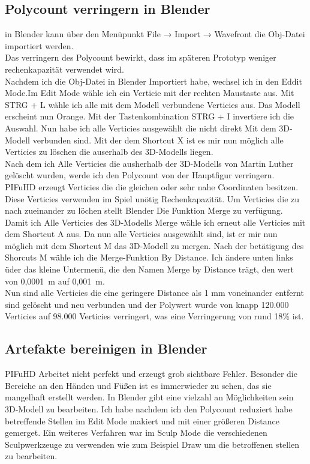 \subsection{Polycount verringern in Blender}
in Blender kann über den Menüpunkt File → Import → Wavefront die Obj-Datei importiert werden. 
\\
Das verringern des Polycount bewirkt, dass im späteren Prototyp weniger rechenkapazität verwendet wird.
\\
Nachdem ich die Obj-Datei in Blender Importiert habe, wechsel ich in den Eddit Mode.Im Edit Mode wähle ich ein Verticie mit der rechten Maustaste aus. Mit STRG + L wähle ich alle mit dem Modell verbundene Verticies aus. Das Modell erscheint nun Orange. Mit der Tastenkombination STRG + I invertiere ich die Auswahl. Nun habe ich alle Verticies ausgewählt die nicht direkt Mit dem 3D-Modell verbunden sind. Mit der dem Shortcut X ist es mir nun möglich alle Verticies zu löschen die auserhalb des 3D-Modells liegen.
\\
Nach dem ich Alle Verticies die ausherhalb der 3D-Modells von Martin Luther gelöscht wurden, werde ich den Polycount von der Hauptfigur verringern. PIFuHD erzeugt Verticies die die gleichen oder sehr nahe Coordinaten besitzen. Diese Verticies verwenden im Spiel unötig Rechenkapazität. Um Verticies die zu nach zueinander zu löchen stellt Blender Die Funktion Merge zu verfügung.
\\
Damit ich Alle Verticies des 3D-Modells Merge wähle ich erneut alle Verticies mit dem Shortcut A aus. Da nun alle Verticies ausgewählt sind, ist er mir nun möglich mit dem Shortcut M das 3D-Modell zu mergen. Nach der betätigung des Shorcuts M wähle ich die Merge-Funktion By Distance. Ich ändere unten links üder das kleine Untermenü, die den Namen Merge by Distance trägt, den wert von 0,0001~m auf 0,001~m.
\\
Nun sind alle Verticies die eine geringere Distance als 1 mm voneinander entfernt sind gelöscht und neu verbunden und der Polywert wurde von knapp 120.000 Verticies auf 98.000 Verticies verringert, was eine Verringerung von rund 18\% ist.
\\
\subsection{Artefakte bereinigen in Blender}%
PIFuHD Arbeitet nicht perfekt und erzeugt grob sichtbare Fehler. Besonder die Bereiche an den Händen und Füßen ist es immerwieder zu sehen, das sie mangelhaft erstellt werden. In Blender gibt eine vielzahl an Möglichkeiten sein 3D-Modell zu bearbeiten. Ich habe nachdem ich den Polycount reduziert habe betreffende Stellen im Edit Mode makiert und mit einer größeren Distance gemerget. Ein weiteres Verfahren war im Sculp Mode die verschiedenen Sculpwerkzeuge zu verwenden wie zum Beispiel Draw um die betroffenen stellen zu bearbeiten.
